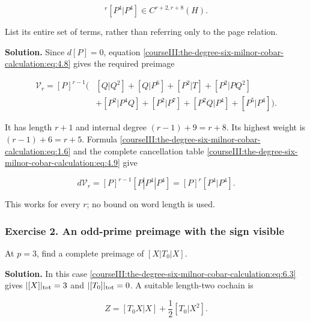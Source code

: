\begin{equation}
[P]^r[P^4|P^4]\in C^{r+2,r+8}(H).
 \label{courseIII:the-degree-six-milnor-cobar-calculation:eq:7.1}
\end{equation}

List its entire set of terms, rather than referring only to the page relation.

\textbf{Solution.} Since \(d[P]=0\), equation \eqref{courseIII:the-degree-six-milnor-cobar-calculation:eq:4.8} gives the required preimage

\begin{equation}
\begin{aligned}
 \mathcal V_r=[P]^{r-1}\bigl(&[Q|Q^2]+[Q|P^6]+[P^2|T]
             +[P^2|PQ^2]\\
             &+[P^2|P^4Q]+[P^2|P^7]
             +[P^2Q|P^4]+[P^5|P^4]\bigr).
\end{aligned}
\label{courseIII:the-degree-six-milnor-cobar-calculation:eq:7.2}
\end{equation}

It has length \(r+1\) and internal degree \((r-1)+9=r+8\). Its highest weight is \((r-1)+6=r+5\). Formula \eqref{courseIII:the-degree-six-milnor-cobar-calculation:eq:1.6} and the complete cancellation table \eqref{courseIII:the-degree-six-milnor-cobar-calculation:eq:4.9} give

\begin{equation}
d\mathcal V_r=[P]^{r-1}[P|P^4|P^4]
              =[P]^r[P^4|P^4].
 \label{courseIII:the-degree-six-milnor-cobar-calculation:eq:7.3}
\end{equation}

This works for every \(r\); no bound on word length is used.

\subsubsection{Exercise 2. An odd-prime preimage with the sign visible}
\label{courseIII:the-degree-six-milnor-cobar-calculation:exercise-2}

\label{courseIII:milnor-cobar:7.2}

At \(p=3\), find a complete preimage of \([X|T_0|X]\).

\textbf{Solution.} In this case \eqref{courseIII:the-degree-six-milnor-cobar-calculation:eq:6.3} gives \(|[X]|_{\rm tot}=3\) and \(|[T_0]|_{\rm tot}=0\). A suitable length-two cochain is

\begin{equation}
Z=[T_0X|X]+\frac12[T_0|X^2].
 \label{courseIII:the-degree-six-milnor-cobar-calculation:eq:7.4}
\end{equation}


